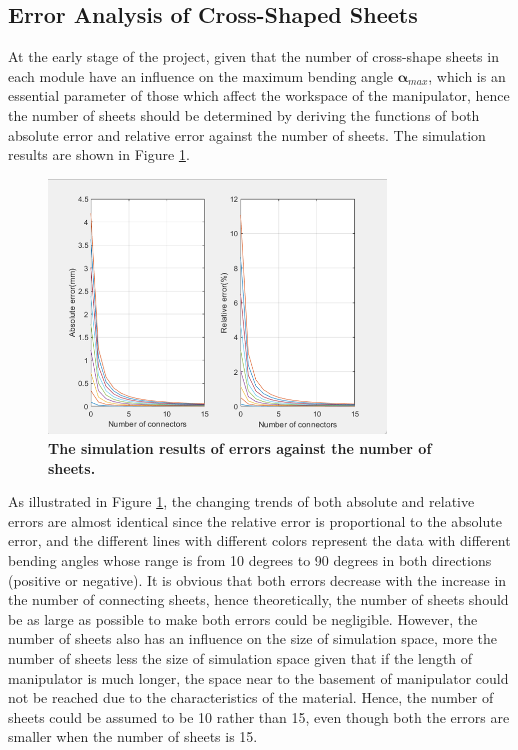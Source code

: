 \subsection{Error Analysis of Cross-Shaped Sheets}
At the early stage of the project, given that the number of cross-shape sheets in each module have an 
influence on the maximum bending angle $\boldsymbol{\alpha}_{max}$, which is an essential parameter of those which 
affect the workspace of the manipulator, hence the number of sheets should be determined by deriving 
the functions of both absolute error and relative error \cite{fishboneCR} against the number of sheets. The 
simulation results are shown in Figure \ref{fig:error_analysis}.
\begin{figure}[H] %
    \centering 
    \captionsetup{labelsep=colon}
    \includegraphics[width=0.8\textwidth]{Image/Result/error_analysis.png} 
    \caption[The simulation results of errors against the number of sheets]
    {\centering \textbf{The simulation results of errors against the number of sheets.}}
    \label{fig:error_analysis}
\end{figure}
\noindent As illustrated in Figure \ref{fig:error_analysis}, the changing trends of both absolute and 
relative errors are almost identical since 
the relative error is proportional to the absolute error, and the different lines with different colors represent 
the data with different bending angles whose range is from 10 degrees to 90 degrees in both directions (positive 
or negative). It is obvious that both errors decrease with the increase in the number of connecting sheets, hence 
theoretically, the number of sheets should be as large as possible to make both errors could be negligible. However, 
the number of sheets also has an influence on the size of simulation space, more the number of sheets less the size 
of simulation space given that if the length of manipulator is much longer, the space near to the basement of 
manipulator could not be reached due to the characteristics of the material. Hence, the number of sheets could be 
assumed to be 10 rather than 15, even though both the errors are smaller when the number of sheets is 15. 
